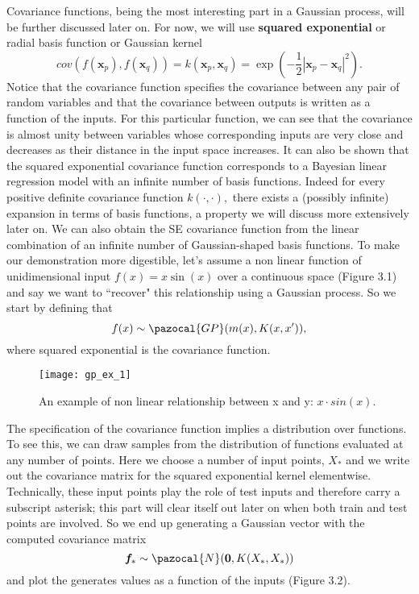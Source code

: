 \documentclass[12pt,a4paper,oneside]{book}
\theoremstyle{plain}
\theoremstyle{definition}
\begin{document}
{\vspace{3mm}\newline
Covariance functions, being the most interesting part in a Gaussian process, will be further discussed later on. For now, we will use \textbf{squared exponential} or radial basis function or Gaussian kernel $$cov(f(\bm{x}_p),f(\bm{x}_q))= k(\bm{x}_p,\bm{x}_q)=\exp (-\frac{1}{2}|\bm{x}_p-\bm{x}_q|^2).$$ Notice that the covariance function specifies the covariance between any pair of random variables and that the covariance between outputs is written as a function of the inputs. For this particular function, we can see that the covariance is almost unity between variables whose corresponding inputs are very close and decreases as their distance in the input space increases. 
\vspace{3mm}\newline
It can also be shown that the squared exponential covariance function corresponds to a Bayesian linear regression model with an infinite number of basis functions. Indeed for every positive definite covariance function $k(\cdot,\cdot),$ there exists a (possibly infinite) expansion in terms of basis functions, a property we will discuss more extensively later on. We can also obtain the SE covariance function from the linear combination of an infinite number of Gaussian-shaped basis functions. 
\vspace{3mm}\newline
To make our demonstration more digestible, let's assume a non linear function of unidimensional input $f(x)=x\sin(x)$ over a continuous space (Figure 3.1) and say we want to ``recover" this relationship using a Gaussian process. So we start by defining that $$f(x)\sim \pazocal{GP}(m(x),K(x,x')),$$ where squared exponential is the covariance function.   
\begin{figure}[h]
\begin{center}
\texttt{[image: gp\_ex\_1]}
\caption{An example of non linear relationship between x and y: $x\cdot sin(x)$.}
\end{center}
\end{figure}

\vspace{2mm}
\noindent
The specification of the covariance function implies a distribution over functions. To see this, we can draw samples from the distribution of functions evaluated at any number of points. Here we choose a number of input points, $X_*$ and we write out the covariance matrix for the squared exponential kernel elementwise. Technically, these input points play the role of test inputs and therefore carry a subscript asterisk; this part will clear itself out later on when both train and test points are involved. So we end up generating a Gaussian vector with the computed covariance matrix $$\bm{f}_*\sim \pazocal{N}(\bm{0},K(X_*,X_*))$$ and plot the generates values as a function of the inputs (Figure 3.2).

}
\end{document}
